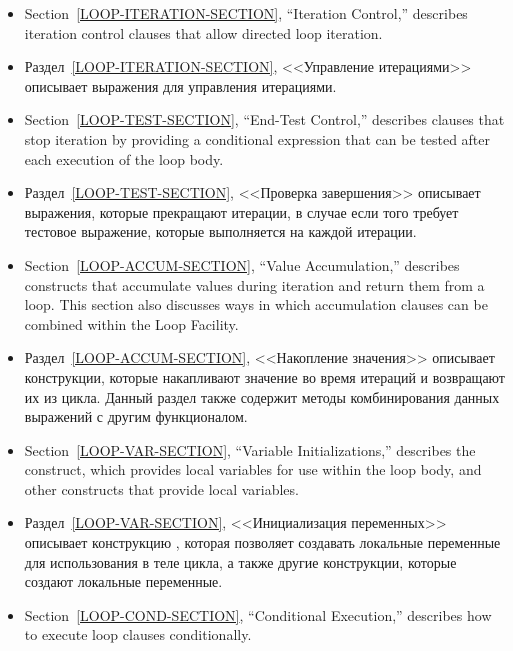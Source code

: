 \begin{itemize}

\item Section~\ref{LOOP-ITERATION-SECTION}, ``Iteration Control,''
  describes iteration control clauses that allow directed loop
  iteration.

\item Раздел~\ref{LOOP-ITERATION-SECTION}, <<Управление итерациями>>
  описывает выражения для управления итерациями.

\item Section~\ref{LOOP-TEST-SECTION}, ``End-Test Control,'' describes
  clauses that stop iteration by providing a conditional expression
  that can be tested after each execution of the loop body.

\item Раздел~\ref{LOOP-TEST-SECTION}, <<Проверка завершения>>
  описывает выражения, которые прекращают итерации, в случае если того
  требует тестовое выражение, которые выполняется на каждой итерации.

\item Section~\ref{LOOP-ACCUM-SECTION}, ``Value Accumulation,''
  describes constructs that accumulate values during iteration and
  return them from a loop.  This section also discusses ways in which
  accumulation clauses can be combined within the Loop Facility.

\item Раздел~\ref{LOOP-ACCUM-SECTION}, <<Накопление значения>>
  описывает конструкции, которые накапливают значение во время
  итераций и возвращают их из цикла. Данный раздел также содержит
  методы комбинирования данных выражений с другим функционалом.

\item Section~\ref{LOOP-VAR-SECTION}, ``Variable Initializations,''
  describes the  construct, which provides local variables
  for use within the loop body, and other constructs that provide
  local variables.

\item Раздел~\ref{LOOP-VAR-SECTION}, <<Инициализация переменных>>
  описывает конструкцию , которая позволяет создавать
  локальные переменные для использования в теле цикла, а также другие
  конструкции, которые создают локальные переменные.

\item Section~\ref{LOOP-COND-SECTION}, ``Conditional Execution,''
  describes how to execute loop clauses conditionally.


\end{itemize}
